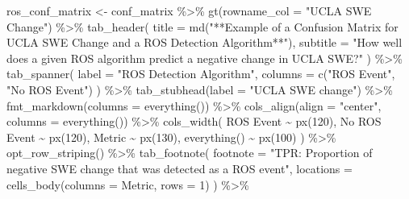 \documentclass[
  10pt,
  letterpaper,
  DIV=11,
  numbers=noendperiod]{scrartcl}
\newenvironment{Shaded}{\begin{snugshade}}{\end{snugshade}}
\newcommand{\AttributeTok}[1]{\textcolor[rgb]{0.40,0.45,0.13}{#1}}
\newcommand{\DecValTok}[1]{\textcolor[rgb]{0.68,0.00,0.00}{#1}}
\newcommand{\FunctionTok}[1]{\textcolor[rgb]{0.28,0.35,0.67}{#1}}
\newcommand{\NormalTok}[1]{\textcolor[rgb]{0.00,0.23,0.31}{#1}}
\newcommand{\OtherTok}[1]{\textcolor[rgb]{0.00,0.23,0.31}{#1}}
\newcommand{\SpecialCharTok}[1]{\textcolor[rgb]{0.37,0.37,0.37}{#1}}
\newcommand{\StringTok}[1]{\textcolor[rgb]{0.13,0.47,0.30}{#1}}
\begin{document}
\begin{Shaded}
\begin{Highlighting}[]
\NormalTok{ros\_conf\_matrix }\OtherTok{\textless{}{-}}\NormalTok{ conf\_matrix }\SpecialCharTok{\%\textgreater{}\%}
  \FunctionTok{gt}\NormalTok{(}\AttributeTok{rowname\_col =} \StringTok{"UCLA SWE Change"}\NormalTok{) }\SpecialCharTok{\%\textgreater{}\%}
  \FunctionTok{tab\_header}\NormalTok{(}
    \AttributeTok{title =} \FunctionTok{md}\NormalTok{(}\StringTok{"**Example of a Confusion Matrix for UCLA SWE Change and a ROS Detection Algorithm**"}\NormalTok{),}
    \AttributeTok{subtitle =} \StringTok{"How well does a given ROS algorithm predict a negative change in UCLA SWE?"}
\NormalTok{  ) }\SpecialCharTok{\%\textgreater{}\%}
  \FunctionTok{tab\_spanner}\NormalTok{(}
    \AttributeTok{label =} \StringTok{"ROS Detection Algorithm"}\NormalTok{,}
    \AttributeTok{columns =} \FunctionTok{c}\NormalTok{(}\StringTok{"ROS Event"}\NormalTok{, }\StringTok{"No ROS Event"}\NormalTok{)}
\NormalTok{  ) }\SpecialCharTok{\%\textgreater{}\%}
  \FunctionTok{tab\_stubhead}\NormalTok{(}\AttributeTok{label =} \StringTok{"UCLA SWE change"}\NormalTok{) }\SpecialCharTok{\%\textgreater{}\%}
  \FunctionTok{fmt\_markdown}\NormalTok{(}\AttributeTok{columns =} \FunctionTok{everything}\NormalTok{()) }\SpecialCharTok{\%\textgreater{}\%}
  \FunctionTok{cols\_align}\NormalTok{(}\AttributeTok{align =} \StringTok{"center"}\NormalTok{, }\AttributeTok{columns =} \FunctionTok{everything}\NormalTok{()) }\SpecialCharTok{\%\textgreater{}\%}
  \FunctionTok{cols\_width}\NormalTok{(}
    \StringTok{\textasciigrave{}}\AttributeTok{ROS Event}\StringTok{\textasciigrave{}} \SpecialCharTok{\textasciitilde{}} \FunctionTok{px}\NormalTok{(}\DecValTok{120}\NormalTok{),}
    \StringTok{\textasciigrave{}}\AttributeTok{No ROS Event}\StringTok{\textasciigrave{}} \SpecialCharTok{\textasciitilde{}} \FunctionTok{px}\NormalTok{(}\DecValTok{120}\NormalTok{),}
\NormalTok{    Metric }\SpecialCharTok{\textasciitilde{}} \FunctionTok{px}\NormalTok{(}\DecValTok{130}\NormalTok{),}
    \FunctionTok{everything}\NormalTok{() }\SpecialCharTok{\textasciitilde{}} \FunctionTok{px}\NormalTok{(}\DecValTok{100}\NormalTok{)}
\NormalTok{  ) }\SpecialCharTok{\%\textgreater{}\%}
  \FunctionTok{opt\_row\_striping}\NormalTok{() }\SpecialCharTok{\%\textgreater{}\%}
  \FunctionTok{tab\_footnote}\NormalTok{(}
    \AttributeTok{footnote =} \StringTok{"TPR: Proportion of negative SWE change that was detected as a ROS event"}\NormalTok{,}
    \AttributeTok{locations =} \FunctionTok{cells\_body}\NormalTok{(}\AttributeTok{columns =}\NormalTok{ Metric, }\AttributeTok{rows =} \DecValTok{1}\NormalTok{)}
\NormalTok{  ) }\SpecialCharTok{\%\textgreater{}\%}

\end{Highlighting}
\end{Shaded}
\end{document}
